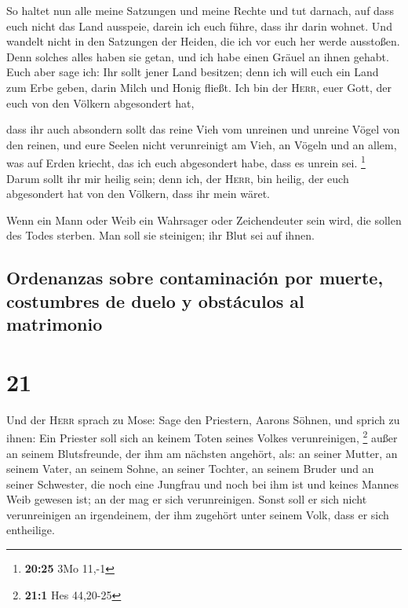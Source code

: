  So haltet nun alle meine Satzungen und meine Rechte und
tut darnach, auf dass euch nicht das Land ausspeie, darein ich euch
führe, dass ihr darin wohnet.  Und wandelt nicht in den
Satzungen der Heiden, die ich vor euch her werde ausstoßen. Denn solches
alles haben sie getan, und ich habe einen Gräuel an ihnen gehabt.
 Euch aber sage ich: Ihr sollt jener Land besitzen; denn
ich will euch ein Land zum Erbe geben, darin Milch und Honig fließt. Ich
bin der \textsc{Herr}, euer Gott, der euch von den Völkern abgesondert
hat,

 dass ihr auch absondern sollt das reine Vieh vom
unreinen und unreine Vögel von den reinen, und eure Seelen nicht
verunreinigt am Vieh, an Vögeln und an allem, was auf Erden kriecht, das
ich euch abgesondert habe, dass es unrein sei. \footnote{\textbf{20:25}
  3Mo 11,-1}  Darum sollt ihr mir heilig sein; denn ich,
der \textsc{Herr}, bin heilig, der euch abgesondert hat von den Völkern,
dass ihr mein wäret.

 Wenn ein Mann oder Weib ein Wahrsager oder Zeichendeuter
sein wird, die sollen des Todes sterben. Man soll sie steinigen; ihr
Blut sei auf ihnen.

\hypertarget{ordenanzas-sobre-contaminaciuxf3n-por-muerte-costumbres-de-duelo-y-obstuxe1culos-al-matrimonio}{%
\subsection{Ordenanzas sobre contaminación por muerte, costumbres de
duelo y obstáculos al
matrimonio}\label{ordenanzas-sobre-contaminaciuxf3n-por-muerte-costumbres-de-duelo-y-obstuxe1culos-al-matrimonio}}

\hypertarget{section-20}{%
\section{21}\label{section-20}}

 Und der \textsc{Herr} sprach zu Mose: Sage den Priestern,
Aarons Söhnen, und sprich zu ihnen: Ein Priester soll sich an keinem
Toten seines Volkes verunreinigen, \footnote{\textbf{21:1} Hes 44,20-25}
 außer an seinem Blutsfreunde, der ihm am nächsten
angehört, als: an seiner Mutter, an seinem Vater, an seinem Sohne, an
seiner Tochter, an seinem Bruder  und an seiner Schwester,
die noch eine Jungfrau und noch bei ihm ist und keines Mannes Weib
gewesen ist; an der mag er sich verunreinigen.  Sonst soll
er sich nicht verunreinigen an irgendeinem, der ihm zugehört unter
seinem Volk, dass er sich entheilige.

